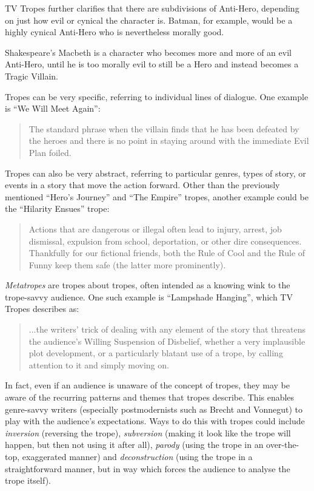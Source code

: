 \documentclass[11pt]{report}
\begin{document}
TV Tropes further clarifies that there are subdivisions of
Anti-Hero, depending on just how evil or cynical the character is. Batman, for
example, would be a highly cynical Anti-Hero who is nevertheless morally good.

Shakespeare's Macbeth is a character who becomes more and more of an evil Anti-Hero, until he is too morally evil
to still be a Hero and instead becomes a Tragic Villain.

Tropes can be very specific, referring to individual lines of dialogue.
One example is ``We Will Meet Again'':

\begin{quote}
The standard phrase when the villain finds that he has been defeated by the heroes and there is no point in staying around with the immediate Evil Plan foiled.
\end{quote}

Tropes can also be very abstract, referring to particular genres, types of
story, or events in a story that move the action forward. Other than the
previously mentioned ``Hero's Journey'' and ``The Empire'' tropes, another
example could be the ``Hilarity Ensues'' trope:

\begin{quote}
Actions that are dangerous or illegal often lead to injury, arrest, job dismissal, expulsion from school, deportation, or other dire consequences. Thankfully for our fictional friends, both the Rule of Cool and the Rule of Funny keep them safe (the latter more prominently).
\end{quote}

\emph{Metatropes} are tropes about tropes, often intended as a knowing wink to
the trope-savvy audience. One such example is ``Lampshade Hanging'', which TV
Tropes describes as:

\begin{quote}
...the writers' trick of dealing with any element of the story that threatens the audience's Willing Suspension of Disbelief, whether a very implausible plot development, or a particularly blatant use of a trope, by calling attention to it and simply moving on.
\end{quote}

In fact, even if an audience is unaware of the concept of tropes, they may be aware
of the recurring patterns and themes that tropes describe. This enables
genre-savvy writers (especially postmodernists such as Brecht and Vonnegut) to play with the audience's
expectations. Ways to do this with tropes could include \emph{inversion}
(reversing the trope),
\emph{subversion} (making it look like the trope will happen, but then not using
it after all), \emph{parody} (using the trope in an over-the-top, exaggerated
manner) and \emph{deconstruction} (using the trope in a straightforward manner,
but in way which forces the audience to analyse the trope itself).
\end{document}
